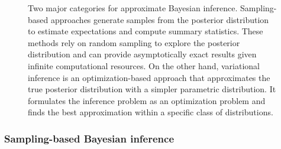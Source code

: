 \begin{figure}
  \centering
  \resizebox{1.0\textwidth}{!}{}
  \caption{
Two major categories for approximate Bayesian inference. Sampling-based approaches generate samples from the posterior distribution to estimate expectations and compute summary statistics. These methods rely on random sampling to explore the posterior distribution and can provide asymptotically exact results given infinite computational resources. On the other hand, variational inference is an optimization-based approach that approximates the true posterior distribution with a simpler parametric distribution. It formulates the inference problem as an optimization problem and finds the best approximation within a specific class of distributions.
  }
  \label{fig:intro:approximate-bayes-methods}
\end{figure}

\subsubsection{Sampling-based Bayesian inference}

